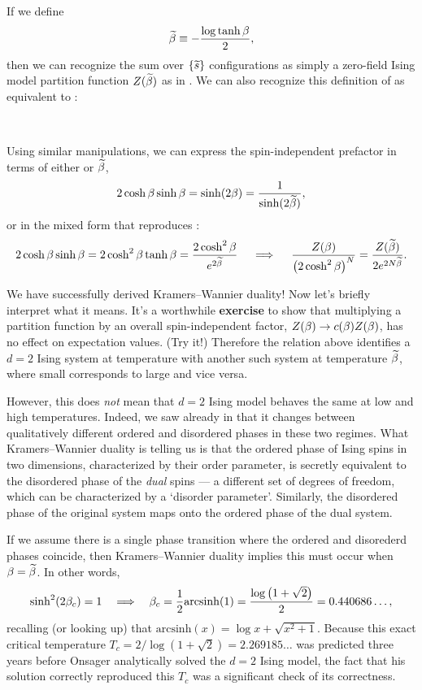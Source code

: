 If we define
\begin{equation*}
  \widetilde{\beta} \equiv -\frac{\log \tanh \beta}{2},
\end{equation*}
then we can recognize the sum over $\left\{\widetilde s\right\}$ configurations as simply a zero-field Ising model partition function $Z(\widetilde{\beta})$ as in .
We can also recognize this definition of \betw as equivalent to :
\begin{mdframed}
  \ \\[100 pt]
\end{mdframed}
Using similar manipulations, we can express the spin-independent prefactor in terms of either \be or $\widetilde{\beta}$,
\begin{equation*}
  2\cosh\beta \sinh\beta = \sinh(2\beta) = \frac{1}{\sinh(2\widetilde{\beta})},
\end{equation*}
or in the mixed form that reproduces :
\begin{equation*}
  2\cosh\beta \sinh\beta = 2\cosh^2 \beta \tanh\beta = \frac{2\cosh^2 \beta}{e^{2\widetilde{\beta}}} \quad \implies \quad \frac{Z(\beta)}{\left(2\cosh^2\beta\right)^N} = \frac{Z(\widetilde{\beta})}{2e^{2N\widetilde{\beta}}}.
\end{equation*}

We have successfully derived Kramers--Wannier duality!
Now let's briefly interpret what it means.
It's a worthwhile \textbf{exercise} to show that multiplying a partition function by an overall spin-independent factor, $Z(\beta) \to c(\beta) Z(\beta)$, has no effect on expectation values.
(Try it!)
Therefore the relation above identifies a $d = 2$ Ising system at temperature \be with another such system at temperature $\widetilde{\beta}$, where small \be corresponds to large \betw and vice versa.

However, this does \textit{not} mean that $d = 2$ Ising model behaves the same at low and high temperatures.
Indeed, we saw already in  that it changes between qualitatively different ordered and disordered phases in these two regimes.
What Kramers--Wannier duality is telling us is that the ordered phase of Ising spins in two dimensions, characterized by their order parameter, is secretly equivalent to the disordered phase of the \textit{dual} spins --- a different set of degrees of freedom, which can be characterized by a `disorder parameter'.
Similarly, the disordered phase of the original system maps onto the ordered phase of the dual system.

If we assume there is a single phase transition where the ordered and disorederd phases coincide, then Kramers--Wannier duality implies this must occur when $\beta = \widetilde{\beta}$.
In other words,
\begin{equation*}
  \sinh^2(2\beta_c) = 1 \quad \Longrightarrow \quad \beta_c = \frac{1}{2} \mathrm{arcsinh}(1) = \frac{\log\left(1 + \sqrt{2}\right)}{2} = 0.440686\dots,
\end{equation*}
recalling (or looking up) that $\mathrm{arcsinh}(x) = \log{x + \sqrt{x^2 + 1}}$.
Because this exact critical temperature $T_c = 2 / \log\left(1 + \sqrt{2}\right) = 2.269185\dots$ was predicted three years before Onsager analytically solved the $d = 2$ Ising model, the fact that his solution correctly reproduced this $T_c$ was a significant check of its correctness.


